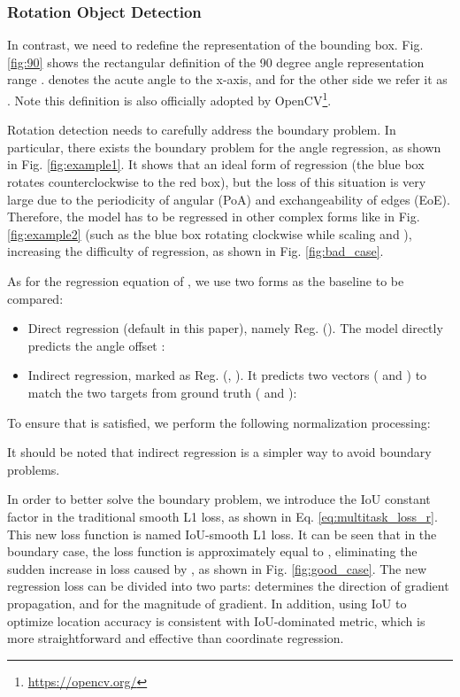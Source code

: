 \documentclass[10pt,journal,compsoc]{IEEEtran}
\begin{document}
\subsubsection{Rotation Object Detection}
\label{sec:rod}
In contrast, we need to redefine the representation of the bounding box. Fig. \ref{fig:90} shows the rectangular definition of the 90 degree angle representation range \cite{yang2018automatic, yang2019scrdet, yang2021r3det,qian2021learning,yang2018position}.  denotes the acute angle to the x-axis, and for the other side we refer it as . Note this definition is also officially adopted by OpenCV\footnote{\url{https://opencv.org/}}. 

Rotation detection needs to carefully address the boundary problem. In particular, there exists the boundary problem for the angle regression, as shown in Fig. \ref{fig:example1}. It shows that an ideal form of regression (the blue box rotates counterclockwise to the red box), but the loss of this situation is very large due to the periodicity of angular (PoA) and exchangeability of edges (EoE). Therefore, the model has to be regressed in other complex forms like in Fig. \ref{fig:example2} (such as the blue box rotating clockwise while scaling  and ), increasing the difficulty of regression, as shown in Fig. \ref{fig:bad_case}.

As for the regression equation of , we use two forms as the baseline to be compared:
\begin{itemize}
	\item Direct regression (default in this paper), namely Reg. (). The model directly predicts the angle offset :
	
	\item Indirect regression, marked as Reg. (, ). It predicts two vectors ( and ) to match the two targets from ground truth ( and ):
	
\end{itemize}
To ensure that  is satisfied, we perform the following normalization processing:


It should be noted that indirect regression is a simpler way to avoid boundary problems.

In order to better solve the boundary problem, we introduce the IoU constant factor  in the traditional smooth L1 loss, as shown in Eq. \ref{eq:multitask_loss_r}. This new loss function is named IoU-smooth L1 loss. It can be seen that in the boundary case, the loss function is approximately equal to , eliminating the sudden increase in loss caused by , as shown in Fig. \ref{fig:good_case}. The new regression loss can be divided into two parts:  determines the direction of gradient propagation, and  for the magnitude of  gradient. In addition, using IoU to optimize location accuracy is consistent with IoU-dominated metric, which is more straightforward and effective than coordinate regression.
\end{document}
